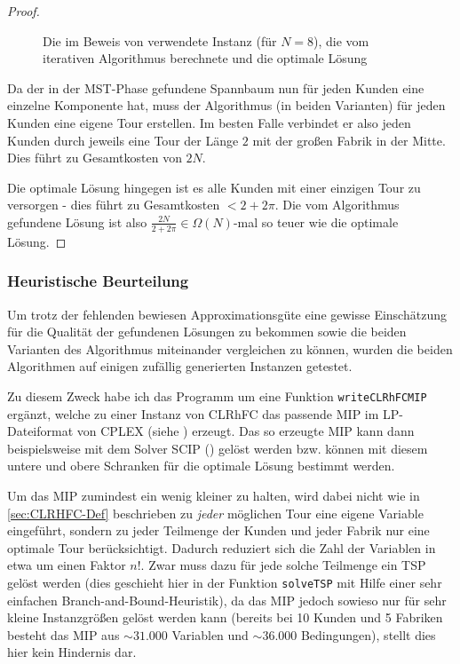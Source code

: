 \documentclass[a4paper,ngerman,11pt,bibtotoc]{scrartcl}
\theoremstyle{definition}
\theoremstyle{plain}
\theoremstyle{remark}
\newcommand{\CLRHFC}{CLRhFC}
\newcommand{\MST}{MST}
\begin{document}
\begin{proof}
\begin{figure}[h]
		\caption{Die im Beweis von  verwendete Instanz (für $N=8$), die vom iterativen Algorithmus berechnete und die optimale Lösung}\label{fig:bsp:schlechterApproximationsguete}
		\end{figure}
		Da der in der \MST-Phase gefundene Spannbaum nun für jeden Kunden eine einzelne Komponente hat, muss der Algorithmus (in beiden Varianten) für jeden Kunden eine eigene Tour erstellen. Im besten Falle verbindet er also jeden Kunden durch jeweils eine Tour der Länge $2$ mit der großen Fabrik in der Mitte. Dies führt zu Gesamtkosten von $2N$.
		
		Die optimale Lösung hingegen ist es alle Kunden mit einer einzigen Tour zu versorgen - dies führt zu Gesamtkosten $< 2 + 2\pi$. Die vom Algorithmus gefundene Lösung ist also $\frac{2N}{2+2\pi} \in \Omega(N)$-mal so teuer wie die optimale Lösung.		
	\end{proof}
		
	\subsubsection{Heuristische Beurteilung}
	
	Um trotz der fehlenden bewiesen Approximationsgüte eine gewisse Einschätzung für die Qualität der gefundenen Lösungen zu bekommen sowie die beiden Varianten des Algorithmus miteinander vergleichen zu können, wurden die beiden Algorithmen auf einigen zufällig generierten Instanzen getestet. 
	
	Zu diesem Zweck habe ich das Programm um eine Funktion \lstinline|writeCLRhFCMIP| ergänzt, welche zu einer Instanz von \CLRHFC{} das passende MIP im LP-Dateiformat von CPLEX (siehe \cite{LPFileFormat}) erzeugt. Das so erzeugte MIP kann dann beispielsweise mit dem Solver SCIP (\cite{SCIP}) gelöst werden bzw. können mit diesem untere und obere Schranken für die optimale Lösung bestimmt werden.
	
	Um das MIP zumindest ein wenig kleiner zu halten, wird dabei nicht wie in \cref{sec:CLRHFC-Def} beschrieben zu \emph{jeder} möglichen Tour eine eigene Variable eingeführt, sondern zu jeder Teilmenge der Kunden und jeder Fabrik nur eine optimale Tour berücksichtigt. Dadurch reduziert sich die Zahl der Variablen in etwa um einen Faktor $n!$. Zwar muss dazu für jede solche Teilmenge ein TSP gelöst werden (dies geschieht hier in der Funktion \lstinline|solveTSP| mit Hilfe einer sehr einfachen Branch-and-Bound-Heuristik), da das MIP jedoch sowieso nur für sehr kleine Instanzgrößen gelöst werden kann (bereits bei 10 Kunden und 5 Fabriken besteht das MIP aus $\sim 31.000$ Variablen und $\sim 36.000$ Bedingungen), stellt dies hier kein Hindernis dar.
\end{document}
